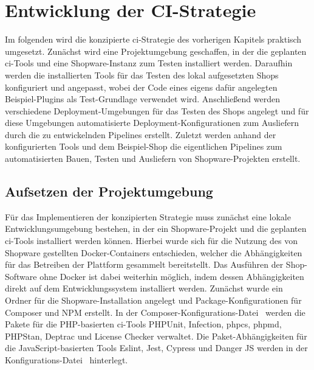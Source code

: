 
\section{Entwicklung der CI-Strategie} \label{sec:04-implementation}

Im folgenden wird die konzipierte \acrshort{ci}-Strategie des vorherigen Kapitels praktisch umgesetzt.
Zunächst wird eine Projektumgebung geschaffen, in der die geplanten \acrshort{ci}-Tools und eine Shopware-Instanz zum
Testen installiert werden.
Daraufhin werden die installierten Tools für das Testen des lokal aufgesetzten Shops konfiguriert und angepasst,
wobei der Code eines eigens dafür angelegten Beispiel-Plugins als Test-Grundlage verwendet wird.
Anschließend werden verschiedene Deployment-Umgebungen für das Testen des Shops angelegt und für diese Umgebungen
automatisierte Deployment-Konfigurationen zum Ausliefern durch die zu entwickelnden Pipelines erstellt.
Zuletzt werden anhand der konfigurierten Tools und dem Beispiel-Shop die eigentlichen Pipelines zum
automatisierten Bauen, Testen und Ausliefern von Shopware-Projekten erstellt.

\subsection{Aufsetzen der Projektumgebung} \label{subsec:04-implementation-1}


Für das Implementieren der konzipierten Strategie muss zunächst eine lokale Entwicklungsumgebung bestehen, in der ein
Shopware-Projekt und die geplanten \acrshort{ci}-Tools installiert werden können.
Hierbei wurde sich für die Nutzung des von Shopware gestellten Docker-Containers entschieden, welcher die
Abhängigkeiten für das Betreiben der Plattform gesammelt bereitstellt.
Das Ausführen der Shop-Software ohne Docker ist dabei weiterhin möglich, indem dessen Abhängigkeiten direkt auf dem
Entwicklungssystem installiert werden.
Zunächst wurde ein Ordner für die Shopware-Installation angelegt und Package-Konfigurationen für Composer und NPM
erstellt.
In der Composer-Konfigurations-Datei\  werden die Pakete für die PHP-basierten
\acrshort{ci}-Tools PHPUnit, Infection, \acrshort{phpcs}, \acrshort{phpmd}, PHPStan, Deptrac und License Checker
verwaltet.
Die Paket-Abhängigkeiten für die JavaScript-basierten Tools Eslint, Jest, Cypress und Danger JS werden in der
Konfigurations-Datei\  hinterlegt.

